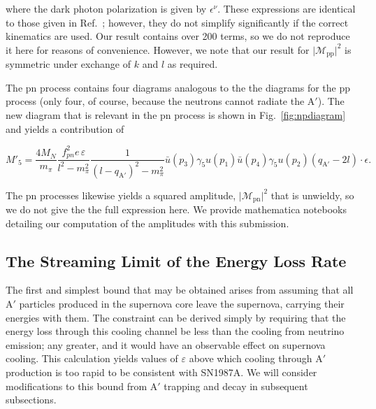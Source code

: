 \documentclass[nofootinbib,prd,superscriptaddress,twocolumn]{revtex4}
\newcommand{\qa}{q_{\mathrm{A}'}}
\newcommand{\Aprime}{\mathrm{A}'}
\begin{document}
%
where the dark photon polarization is given by $\epsilon^{\nu}$. These expressions are identical to those 
given in Ref.~\cite{dent_etal12}; however, they do not simplify significantly if the correct kinematics are used. 
Our result contains over 200 terms, 
so we do not reproduce it here for reasons of convenience. However, we note that 
our result for $\vert \mathcal{M}_{\mathrm{pp}} \vert^2$ is symmetric 
under exchange of $k$ and $l$ as required. 

The pn process contains four diagrams analogous to the the diagrams for the pp process (only four, of course, 
because the neutrons cannot radiate the $\Aprime$). The new diagram that is relevant in the pn process is shown in 
Fig.~\ref{fig:npdiagram} and yields a contribution of 
%
\begin{widetext}
\begin{equation}
M'_5 = \frac{4 M_N}{ m_\pi} \frac{f_{pn}^2 e\, \varepsilon}{l^2-m_\pi^2}  \frac{1}{(l-\qa)^2 - m_\pi^2} 
\bar{u}(p_3) \gamma_5 u(p_1) \bar{u}(p_4) \gamma_5 u(p_2) (\qa - 2l)\cdot \epsilon.
\end{equation}
\end{widetext}
%
The pn processes likewise yields a squared amplitude, 
$\vert \mathcal{M}_{\mathrm{pn}} \vert^2$ that is unwieldy, so we do not give the 
the full expression here. We provide mathematica notebooks detailing our 
computation of the amplitudes with this submission.


\subsection{The Streaming Limit of the Energy Loss Rate}

The first and simplest bound that may be obtained arises from 
assuming that all $\Aprime$ particles produced in the supernova core 
leave the supernova, carrying their energies with them. The constraint can be derived simply by 
requiring that the energy loss through this cooling channel be less than the cooling from neutrino emission; 
any greater, and it would have an observable effect on supernova cooling. This calculation yields values of 
$\varepsilon$ above which cooling through $\Aprime$ production is too rapid to be consistent with SN1987A. 
We will consider modifications to this bound from $\Aprime$ trapping and decay in subsequent subsections.
\end{document}
